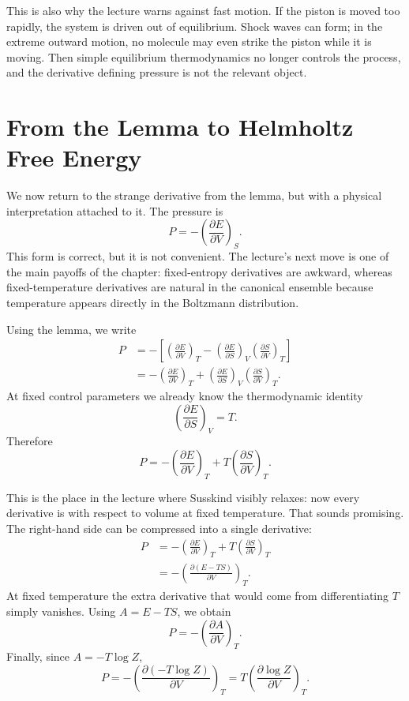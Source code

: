 This is also why the lecture warns against fast motion. If the piston is moved too rapidly, the system is driven out of equilibrium. Shock waves can form; in the extreme outward motion, no molecule may even strike the piston while it is moving. Then simple equilibrium thermodynamics no longer controls the process, and the derivative defining pressure is not the relevant object.

\section{From the Lemma to Helmholtz Free Energy}

We now return to the strange derivative from the lemma, but with a physical interpretation attached to it. The pressure is
\begin{equation}
P = -\left(\frac{\partial E}{\partial V}\right)_S.
\end{equation}
This form is correct, but it is not convenient. The lecture's next move is one of the main payoffs of the chapter: fixed-entropy derivatives are awkward, whereas fixed-temperature derivatives are natural in the canonical ensemble because temperature appears directly in the Boltzmann distribution.

Using the lemma, we write
\begin{align}
P
&=
-
\left[
\left(\frac{\partial E}{\partial V}\right)_T
-
\left(\frac{\partial E}{\partial S}\right)_V
\left(\frac{\partial S}{\partial V}\right)_T
\right] \\
&=
-
\left(\frac{\partial E}{\partial V}\right)_T
+
\left(\frac{\partial E}{\partial S}\right)_V
\left(\frac{\partial S}{\partial V}\right)_T.
\end{align}
At fixed control parameters we already know the thermodynamic identity
\begin{equation}
\left(\frac{\partial E}{\partial S}\right)_V = T.
\end{equation}
Therefore
\begin{equation}
P
=
-
\left(\frac{\partial E}{\partial V}\right)_T
+
T\left(\frac{\partial S}{\partial V}\right)_T.
\end{equation}

This is the place in the lecture where Susskind visibly relaxes: now every derivative is with respect to volume at fixed temperature. That sounds promising. The right-hand side can be compressed into a single derivative:
\begin{align}
P
&=
-
\left(\frac{\partial E}{\partial V}\right)_T
+
T\left(\frac{\partial S}{\partial V}\right)_T \\
&=
-
\left(\frac{\partial (E-TS)}{\partial V}\right)_T.
\end{align}
At fixed temperature the extra derivative that would come from differentiating \(T\) simply vanishes. Using \(A=E-TS\), we obtain
\begin{equation}
P = -\left(\frac{\partial A}{\partial V}\right)_T.
\end{equation}
Finally, since \(A=-T\log Z\),
\begin{equation}
P
=
-\left(\frac{\partial (-T\log Z)}{\partial V}\right)_T
=
T\left(\frac{\partial \log Z}{\partial V}\right)_T.
\end{equation}

